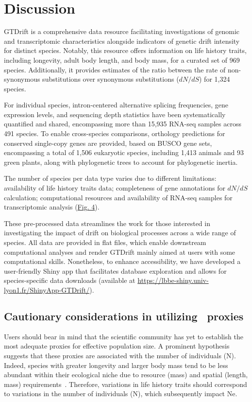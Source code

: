 \section{Discussion}
GTDrift is a comprehensive data resource facilitating investigations of genomic and transcriptomic characteristics alongside indicators of genetic drift intensity for distinct species. Notably, this resource offers information on life history traits, including longevity, adult body length, and body mass, for a curated set of 969 species. Additionally, it provides estimates of the ratio between the rate of non-synonymous \gls{substitution}s over synonymous \gls{substitution}s (${dN}/{dS}$) for 1,324 species.

For individual species, intron-centered alternative splicing frequencies, gene expression levels, and sequencing depth statistics have been systematically quantified and shared, encompassing more than 15,935 RNA-seq samples across 491 species. To enable cross-species comparisons, orthology predictions for conserved single-copy genes are provided, based on \acrshort{BUSCO} gene sets, encompassing a total of 1,506 eukaryotic species, including 1,413 animals and 93 green plants, along with phylogenetic trees to account for phylogenetic inertia.

The number of species per data type varies due to different limitations: availability of life history traits data; completeness of gene annotations for ${dN}/{dS}$ calculation; computational resources and availability of RNA-seq samples for transcriptomic analysis (\hyperref[fig:gtdrift4]{Fig. 4}).

These pre-processed data streamlines the work for those interested in investigating the impact of drift on biological processes across a wide range of species. All data are provided in flat files, which enable downstream computational analyses and render GTDrift mainly aimed at users with some computational skills. Nonetheless, to enhance accessibility, we have developed a user-friendly Shiny app that facilitates database exploration and allows for species-specific data downloads (available at \url{https://lbbe-shiny.univ-lyon1.fr/ShinyApp-GTDrift/}).

\subsection{Cautionary considerations in utilizing \Ne~proxies}

Users should bear in mind that the scientific community has yet to establish the most adequate proxies for effective population size. A prominent hypothesis suggests that these proxies are associated with the number of individuals (\acrshort{N}). Indeed, species with greater longevity and larger body mass tend to be less abundant within their ecological niche due to resource (mass) and spatial (length, mass) requirements~\citep{damuth_population_1981, nee_relationship_1991, white_relationships_2007}. Therefore, variations in life history traits should correspond to variations in the number of individuals (\acrshort{N}), which subsequently impact \acrshort{Ne}.


